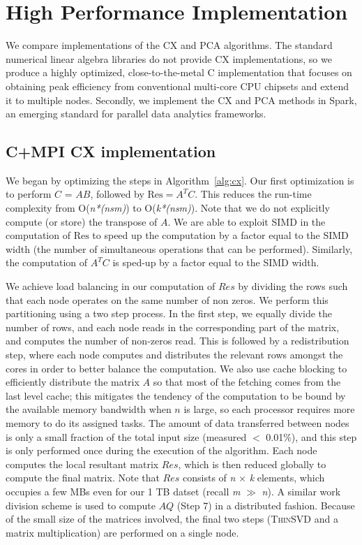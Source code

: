 
\section{High Performance Implementation}
\label{sec:implementation}

We compare implementations of the CX and PCA algorithms.  The standard
numerical linear algebra libraries do not provide CX implementations, so we
produce a highly optimized, close-to-the-metal C implementation that focuses on
obtaining peak efficiency from conventional multi-core CPU chipsets and extend
it to multiple nodes.  Secondly, we implement the CX and PCA methods in Spark,
an emerging standard for parallel data analytics frameworks. 

\subsection {C+MPI CX implementation}
\label{sxn:single_node_opt}

We began by optimizing the steps in Algorithm~\ref{alg:cx}. Our first optimization is to perform $C$ = $AB$, 
followed by $\mathrm{Res} = A^TC$. This reduces the run-time complexity from
O({\it{n*(nsm)}}) to O({\it{k*(nsm)}}). Note that we do not
explicitly compute (or store) the transpose of $A$. We are able to exploit SIMD in the
computation of $\mathrm{Res}$ to speed up the computation by a factor equal to
the SIMD width (the number of simultaneous operations that can be performed).
Similarly, the computation of $A^TC$ is sped-up by a factor equal to the SIMD width.

We achieve load balancing in our computation of $Res$ by dividing
the rows such that each node operates on the same number of non zeros.  We
perform this partitioning using a two step process. In the first step, we
equally divide the number of rows, and each node reads in the corresponding
part of the matrix, and computes the number of non-zeros read. This is followed
by a redistribution step, where each node computes and distributes the relevant
rows amongst the cores in order to better balance the computation. We also use
cache blocking to efficiently distribute the matrix $A$ so that most of the
fetching comes from the last level cache; this mitigates the tendency of the
computation to be bound by the available memory bandwidth when $n$ is large, so
each processor requires more memory to do its assigned tasks. The amount of
data transferred between nodes is only a small fraction of the total input size
(measured $<$ 0.01\%), and this step is only performed once during the
execution of the algorithm. Each node computes the local resultant matrix
$Res$, which is then reduced globally to compute the final matrix. Note that
$Res$ consists of {\it{n}} $\times$ {\it{k}} elements, which occupies a few MBs
even for our 1 TB datset (recall {\it{m}} $\gg$ {\it{n}}).  A similar work
division scheme is used to compute $AQ$ (Step 7) in a distributed fashion.
Because of the small size of the matrices involved, the final two steps
(\textsc{ThinSVD} and a matrix multiplication) are performed on a single node.

